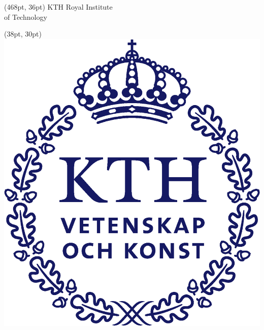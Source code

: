 \makeatletter
\begin{titlepage}
    
    \thispagestyle{empty}
    \begin{textblock*}{120pt}(468pt, 36pt) %
        \colvillebold \small KTH Royal Institute \\of Technology
    \end{textblock*}
    
    \begin{textblock*}{72.85pt}(38pt, 30pt) %
        \includegraphics[width=0.13\paperwidth]{setup/img/KTH_logo_CMYK_bla.eps}
    \end{textblock*}
     

\end{titlepage}
